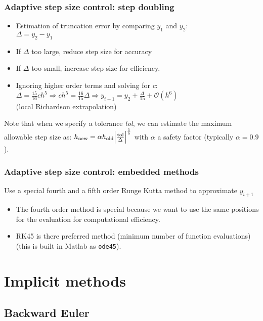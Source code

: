 \documentclass[11pt,table,final,fleqn,xcolor={usenames,dvipsnames,table}]{beamer}
\begin{document}
\begin{frame}
  \frametitle{Adaptive step size control: step doubling}
\begin{itemize}
  \item Estimation of truncation error by comparing $y_1$ and $y_2$:\\
  $\Delta = y_2 - y_1$
  \item If $\Delta$ too large, reduce step size for accuracy
  \item If $\Delta$ too small, increase step size for efficiency.
  \item Ignoring higher order terms and solving for $c$:
  $ \Delta = \frac{15}{16}ch^5 \Rightarrow ch^5 = \frac{16}{15} \Delta \Rightarrow y_{i+1} = y_2 + \frac{\Delta}{15} + \mathcal{O}{(h^6)}$ \\ (local Richardson extrapolation)
\end{itemize}
  Note that when we specify a tolerance \emph{tol}, we can estimate the maximum allowable step size as:
  $ h_\text{new} = \alpha h_\text{old} \abs{\frac{\text{tol}}{\Delta}}^{\frac{1}{5}}$ with $\alpha$ a safety factor (typically $\alpha = 0.9$).
\end{frame}

\begin{frame}
  \frametitle{Adaptive step size control: embedded methods}
  Use a special fourth and a fifth order Runge Kutta method to approximate $y_{i+1}$
  \begin{itemize}
    \item The fourth order method is special because we want to use the same positions for the evaluation for computational efficiency.
    \item RK45 is there preferred method (minimum number of function evaluations) (this is built in Matlab as \lstinline$ode45$).
  \end{itemize}
\end{frame}

\section{Implicit methods}
\subsection{Backward Euler}
\end{document}
